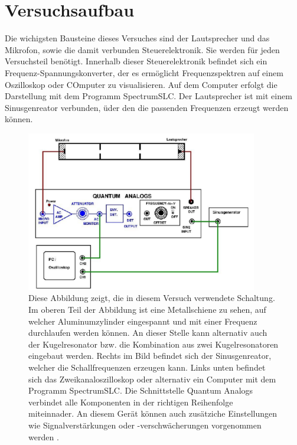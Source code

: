 \section{Versuchsaufbau}
\label{sec:Versuchsaufbau}
Die wichigsten Bausteine dieses Versuches sind der Lautsprecher und das Mikrofon, sowie 
die damit verbunden Steuerelektronik. Sie werden für jeden Versuchsteil benötigt.
Innerhalb dieser Steuerelektronik befindet sich ein Frequenz-Spannungskonverter, 
der es ermöglicht Frequenzspektren auf einem Oszilloskop oder COmputer zu visualisieren.
Auf dem Computer erfolgt die Darstellung mit dem Programm SpectrumSLC.
Der Lautsprecher ist mit einem Sinusgenreator verbunden, üder den die passenden 
Frequenzen erzeugt werden können.

\begin{figure}
    \centering
    \includegraphics[width=0.9\textwidth]{figure/Schaltung.pdf}
    \caption{Diese Abbildung zeigt, die in diesem Versuch verwendete Schaltung. Im 
    oberen Teil der Abbildung ist eine Metallschiene zu sehen, auf welcher 
    Aluminumzylinder eingespannt und mit einer Frequenz durchlaufen 
    werden können. An dieser Stelle kann alternativ auch der Kugelresonator 
    bzw. die Kombination aus zwei Kugelresonatoren eingebaut werden. 
    Rechts im Bild befindet sich der Sinusgenreator, welcher die 
    Schallfrequenzen erzeugen kann. Links unten befindet sich das 
    Zweikanaloszilloskop oder alternativ ein Computer mit dem Programm
    SpectrumSLC. Die Schnittstelle Quantum Analogs verbindet alle 
    Komponenten in der richtigen Reihenfolge miteinnader. An diesem 
    Gerät können auch zusätziche Einstellungen wie Signalverstärkungen 
    oder -verschwächerungen vorgenommen werden
    \cite{sample}.}
\end{figure}

